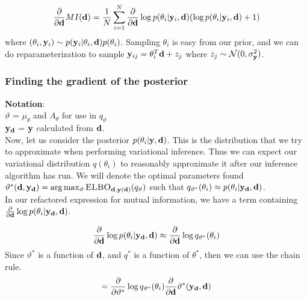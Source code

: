  $$\frac{\partial}{\partial\mathbf{d}}MI(\mathbf{d})= \frac{1}{N}\sum_{i=1}^N\frac{\partial }{\partial \mathbf{d}}\log p(\theta_i |\mathbf{y}_i, \mathbf{d})(\log p(\theta_i |\mathbf{y}_i, \mathbf{d}) + 1)
$$
where $(\theta_i, \mathbf{y}_i)\sim p(\mathbf{y}_i|\theta_i, \mathbf{d})p(\theta_i)$.
Sampling $\theta_i$ is easy from our prior, and we can do reparameterization to sample $\mathbf{y}_{ij}=\theta_i^T \mathbf{d} + z_j$ where $z_j\sim \mathcal{N}(0,\sigma^2_{\mathbf{y}})$.

\subsubsection{Finding the gradient of the posterior}
\textbf{Notation}:\\
$\vartheta$ = $\mu_\theta$ and $A_\theta$ for use in $q_{\vartheta}$\\
$\mathbf{y}_{\mathbf{d}}$ = $\mathbf{y}$ calculated from $\mathbf{d}$.\\
Now, let us consider the posterior $p(\theta_i|\mathbf{y}, \mathbf{d})$. This is the distribution that we try to approximate when performing variational inference. 
Thus we can expect our variational distribution $q(\theta_i)$ to reasonably approximate it after our inference algorithm has run.
We will denote the optimal parameters found $\vartheta^*(\mathbf{d}, \mathbf{y}_{\mathbf{d}}) = \arg \max_\vartheta \textsc{ELBO}_{\mathbf{d}, \mathbf{y}(\mathbf{d})}(q_\vartheta)$ such that $q_{\vartheta^*}(\theta_i)\approx p(\theta_i | \mathbf{y}_{\mathbf{d}}, \mathbf{d})$.\\
In our refactored expression for mutual information, we have a term containing $\frac{\partial }{\partial \mathbf{d}}\log p(\theta_i |\mathbf{y}_{\mathbf{d}}, \mathbf{d})$.

$$\frac{\partial }{\partial \mathbf{d}}\log p(\theta_i|\mathbf{y}_{\mathbf{d}}, \mathbf{d}) \approx \frac{\partial }{\partial \mathbf{d}}\log q_{\vartheta^*}(\theta_i)$$
Since $\vartheta^*$ is a function of $\mathbf{d}$, and $q^*$ is a function of $\theta^*$, then we can use the chain rule.
$$=\frac{\partial}{\partial \vartheta^*}\log q_{\vartheta^*}(\theta_i)\frac{\partial }{\partial \mathbf{d}}\vartheta^*(\mathbf{y}_{\mathbf{d}}, \mathbf{d})$$

